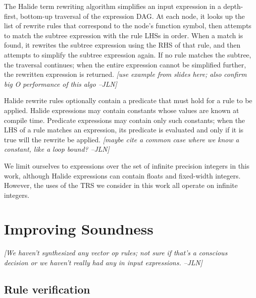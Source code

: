 \documentclass[sigplan,review,anonymous]{acmart}\settopmatter{printfolios=true,printccs=false,printacmref=false}
\newcommand{\jln}[1]{\textcolor{uwpurple}{\textit{[{#1} --JLN]}}}
\begin{document}
The Halide term rewriting algorithm simplifies an input expression in a depth-first, bottom-up traversal of the expression DAG. At each node, it looks up the list of rewrite rules that correspond to the node's function symbol, then attempts to match the subtree expression with the rule LHSs in order. When a match is found, it rewrites the subtree expression using the RHS of that rule, and then attempts to simplify the subtree expression again. If no rule matches the subtree, the traversal continues; when the entire expression cannot be simplified further, the rewritten expression is returned. \jln{use example from slides here; also confirm big O performance of this algo}

Halide rewrite rules optionally contain a predicate that must hold for a rule to be applied. Halide expressions may contain constants whose values are known at compile time. Predicate expressions may contain only such constants; when the LHS of a rule matches an expression, its predicate is evaluated and only if it is true will the rewrite be applied. \jln{maybe cite a common case where we know a constant, like a loop bound?}

We limit ourselves to expressions over the set of infinite precision integers in
this work, although Halide expressions can contain floats and fixed-width
integers. However, the uses of the TRS we consider in this work all operate
on infinite integers.

\section{Improving Soundness}
\jln{We haven't synthesized any vector op rules; not sure if that's a conscious decision or we haven't really had any in input expressions.}


\subsection{Rule verification}
\end{document}
